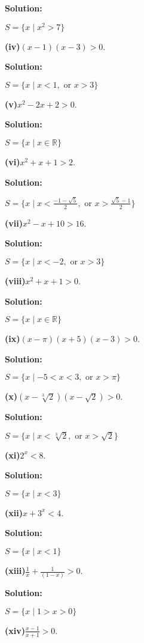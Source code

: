 \documentclass[a4paper,12pt]{report}
\begin{document}
\noindent
\textbf{Solution:}

\noindent
$S=\{x \mid x^2 >7\}$

\noindent
\textbf{(iv)}$(x-1)(x-3)>0$.

\noindent
\textbf{Solution:}

\noindent
$S=\{x \mid x<1, \text{ or } x>3\}$

\noindent
\textbf{(v)}$x^2-2x+2>0$.

\noindent
\textbf{Solution:}

\noindent
$S=\{x \mid x \in \mathbb{R}\}$

\noindent
\textbf{(vi)}$x^2+x+1>2$.

\noindent
\textbf{Solution:}

\noindent
$S=\{x \mid x<\frac{-1-\sqrt{5}}{2}, \text{ or } x>\frac{\sqrt{5}-1}{2}\}$

\noindent
\textbf{(vii)}$x^2-x+10>16$.

\noindent
\textbf{Solution:}

\noindent
$S=\{x \mid x<-2, \text{ or } x>3\}$

\noindent
\textbf{(viii)}$x^2+x+1>0$.

\noindent
\textbf{Solution:}

\noindent
$S=\{x \mid x \in \mathbb{R}\}$

\noindent
\textbf{(ix)}$(x-\pi)(x+5)(x-3)>0$.

\noindent
\textbf{Solution:}

\noindent
$S=\{x \mid -5<x<3, \text{ or } x>\pi\}$

\noindent
\textbf{(x)}$(x-\sqrt[3]{2})(x-\sqrt{2})>0$.

\noindent
\textbf{Solution:}

\noindent
$S=\{x \mid x<\sqrt[3]{2}, \text{ or } x>\sqrt{2}\}$

\noindent
\textbf{(xi)}$2^x<8$.

\noindent
\textbf{Solution:}

\noindent
$S=\{x \mid x<3\}$

\noindent
\textbf{(xii)}$x+3^x<4$.

\noindent
\textbf{Solution:}

\noindent
$S=\{x \mid x<1\}$

\noindent
\textbf{(xiii)}$\frac{1}{x}+\frac{1}{(1-x)}>0$.

\noindent
\textbf{Solution:}

\noindent
$S=\{x \mid 1>x>0\}$

\noindent
\textbf{(xiv)}$\frac{x-1}{x+1}>0$.
\end{document}
